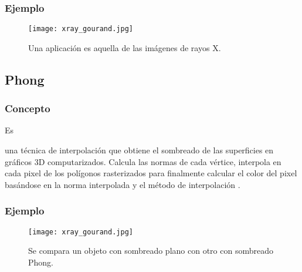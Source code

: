 \documentclass[stu, 12pt, letterpaper, donotrepeattitle, floatsintext, natbib]{apa7}
\begin{document}
    \subsubsection{Ejemplo}
    \begin{figure}[H]
      \centering
      \texttt{[image: xray\_gourand.jpg]}
      \caption{Una aplicación es aquella de las imágenes de rayos X.}
    \end{figure}
    \vspace{\baselineskip}
    \subsection{Phong}
    \subsubsection{Concepto}
    Es \begin{justify}
      una técnica de interpolación que obtiene el sombreado de las superficies en gráficos 3D computarizados.
      Calcula las normas de cada vértice, interpola en cada pixel de los polígonos rasterizados para finalmente calcular el color
      del pixel basándose en la norma interpolada y el método de interpolación \citep{unknown-author-no-date}.\par
    \end{justify}
    \vspace{\baselineskip}
    \subsubsection{Ejemplo}
    \begin{figure}[H]
      \centering
      \texttt{[image: xray\_gourand.jpg]}
      \caption{Se compara un objeto con sombreado plano con otro con sombreado Phong.}
    \end{figure}
    \vspace{\baselineskip}
    \newpage   
    \renewcommand\refname{\textbf{Referencias}}
    
    
\end{document}
